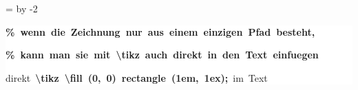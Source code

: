 \begingroup
\ttfamily
{}
=\textwidth
\advance{} by -2\fboxsep
\noindent
\colorbox{background}
{%
\parbox{\dimen255}
{%
\rule[-0.5ex]{0pt}{2.5ex}\hspace*{0.0em}\textcolor{G}{\textbf{\%~wenn~die~Zeichnung~nur~aus~einem~einzigen~Pfad~besteht,}}\\
\rule[-0.5ex]{0pt}{2.5ex}\hspace*{0.0em}\textcolor{G}{\textbf{\%~kann~man~sie~mit~\textbackslash{}tikz~auch~direkt~in~den~Text~einfuegen}}\\
\rule[-0.5ex]{0pt}{2.5ex}\hspace*{0.0em}direkt~\textcolor{R}{\textbf{\textbackslash{}tikz~\textbackslash{}fill~(0,~0)~rectangle~(1em,~1ex);}}~im~Text}%
}%
\endgroup
